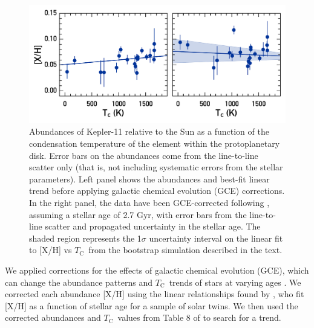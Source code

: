\documentclass[twocolumn]{aastex61}
\newcommand{\tc}{$T_\mathrm{C}$}
\begin{document}
\begin{figure}
\centering
\includegraphics[scale=0.6]{K11_Tc_linear}
\caption{Abundances of Kepler-11 relative to the Sun as a function of the condensation temperature of the element within the protoplanetary disk. Error bars on the abundances come from the line-to-line scatter only (that is, not including systematic errors from the stellar parameters). Left panel shows the abundances and best-fit linear trend before applying galactic chemical evolution (GCE) corrections. In the right panel, the data have been GCE-corrected following \citet{Spina2016b}, assuming a stellar age of 2.7 Gyr, with error bars from the line-to-line scatter and propagated uncertainty in the stellar age. The shaded region represents the 1$\sigma$ uncertainty interval on the linear fit to [X/H] vs \tc\ from the bootstrap simulation described in the text.}
\label{fig:tc}
\end{figure}

We applied corrections for the effects of galactic chemical evolution (GCE), which can change the abundance patterns and \tc\ trends of stars at varying ages \citep{Nissen2015, Spina2016}. We corrected each abundance [X/H] using the linear relationships found by \citet{Spina2016b}, who fit [X/H] as a function of stellar age for a sample of solar twins. We then used the corrected abundances and \tc\ values from Table 8 of \citet{Lodders2003} to search for a trend.
\end{document}
